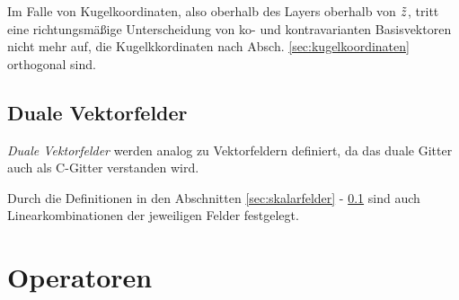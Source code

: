 \documentclass{book}
\newcommand\shifttilde[2]{\stackengine{\Sstackgap}{$#2$}{\(\hspace{#1}\tilde{}\)}{O}{l}{F}{T}{S}}
\newcommand\newtilde[1]{%
\if C#1\shifttilde{4.8 pt}{#1}\else
\if E#1\shifttilde{5.0 pt}{#1}\else
\if F#1\shifttilde{5.0 pt}{#1}\else
\if I#1\shifttilde{3.3 pt}{#1}\else
\if L#1\shifttilde{4.0 pt}{#1}\else
\if S#1\shifttilde{4.0 pt}{#1}\else
\if V#1\shifttilde{4.0 pt}{#1}\else
\if W#1\shifttilde{5.0 pt}{#1}\else
\if f#1\shifttilde{3.3 pt}{#1}\else
\if q#1\shifttilde{3.0 pt}{#1}\else
\if u#1\shifttilde{3.3 pt}{#1}\else
\if v#1\shifttilde{3.3 pt}{#1}\else
\if \psi#1\shifttilde{4.5 pt}{#1}\else
\tilde{#1}
\fi\fi\fi\fi\fi\fi\fi\fi\fi\fi\fi\fi\fi}
\begin{document}
Im Falle von Kugelkoordinaten, also oberhalb des Layers oberhalb von $\newtilde{z}$, tritt eine richtungsmäßige Unterscheidung von ko- und kontravarianten Basisvektoren nicht mehr auf, die Kugelkkordinaten nach Absch. \ref{sec:kugelkoordinaten} orthogonal sind.

\subsection{Duale Vektorfelder}
\label{sec:duale_vektorfelder}

\textit{Duale Vektorfelder} werden analog zu Vektorfeldern definiert, da das duale Gitter auch als C-Gitter verstanden wird.

Durch die Definitionen in den Abschnitten \ref{sec:skalarfelder} - \ref{sec:duale_vektorfelder} sind auch Linearkombinationen der jeweiligen Felder festgelegt.

\section{Operatoren}
\label{sec:operatoren}
\end{document}
